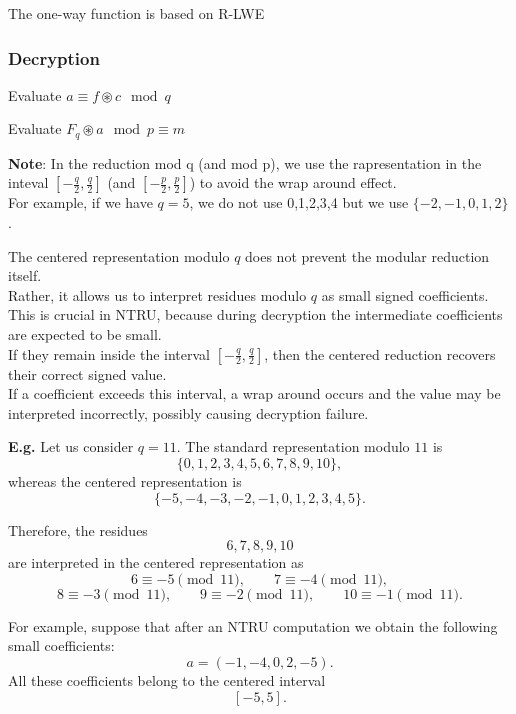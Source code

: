 \noindent
The one-way function is based on R-LWE

\newpage
\subsubsection*{Decryption}
\begin{algorithm}
\begin{algorithmic}[1] 

    \State Evaluate $a \equiv f \circledast c \mod q$

    \State Evaluate $F_q \circledast a \mod p \equiv m$
\end{algorithmic}
\end{algorithm}

\noindent
\textbf{Note}: In the reduction mod q (and mod p), we use the rapresentation in the inteval $[-\frac{q}{2}, \frac{q}{2}]$ (and $[-\frac{p}{2}, \frac{p}{2}]$) to avoid the wrap around effect.\\
For example, if we have $q=5$, we do not use {0,1,2,3,4} but we use $\{-2,-1,0,1,2\}$.
\medskip

\noindent
The centered representation modulo \(q\) does not prevent the modular reduction itself.\\ 
Rather, it allows us to interpret residues modulo \(q\) as small signed coefficients.\\ 
This is crucial in NTRU, because during decryption the intermediate coefficients are expected to be small.\\ 
If they remain inside the interval \([-\frac q2,\frac q2]\), then the centered reduction recovers their correct signed value.\\ 
If a coefficient exceeds this interval, a wrap around occurs and the value may be interpreted incorrectly, possibly causing decryption failure.
\medskip

\noindent
\textbf{E.g.} Let us consider \(q=11\). The standard representation modulo \(11\) is
\[
\{0,1,2,3,4,5,6,7,8,9,10\},
\]
whereas the centered representation is
\[
\{-5,-4,-3,-2,-1,0,1,2,3,4,5\}.
\]

\noindent
Therefore, the residues
\[
6,7,8,9,10
\]
are interpreted in the centered representation as
\[
6 \equiv -5 \pmod{11}, \qquad
7 \equiv -4 \pmod{11},
\]
\[
8 \equiv -3 \pmod{11}, \qquad
9 \equiv -2 \pmod{11}, \qquad
10 \equiv -1 \pmod{11}.
\]
\medskip

\noindent
For example, suppose that after an NTRU computation we obtain the following small coefficients:
\[
a=(-1,-4,0,2,-5).
\]
All these coefficients belong to the centered interval
\[
[-5,5].
\]

